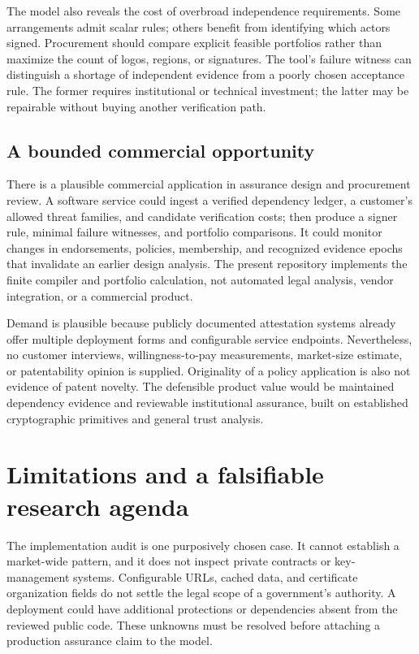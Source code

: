 \documentclass[11pt,letterpaper]{article}
\begin{document}
The model also reveals the cost of overbroad independence requirements. Some arrangements admit scalar rules; others benefit from identifying which actors signed. Procurement should compare explicit feasible portfolios rather than maximize the count of logos, regions, or signatures. The tool's failure witness can distinguish a shortage of independent evidence from a poorly chosen acceptance rule. The former requires institutional or technical investment; the latter may be repairable without buying another verification path.

\subsection{A bounded commercial opportunity}
There is a plausible commercial application in assurance design and procurement review. A software service could ingest a verified dependency ledger, a customer's allowed threat families, and candidate verification costs; then produce a signer rule, minimal failure witnesses, and portfolio comparisons. It could monitor changes in endorsements, policies, membership, and recognized evidence epochs that invalidate an earlier design analysis. The present repository implements the finite compiler and portfolio calculation, not automated legal analysis, vendor integration, or a commercial product.

Demand is plausible because publicly documented attestation systems already offer multiple deployment forms and configurable service endpoints. Nevertheless, no customer interviews, willingness-to-pay measurements, market-size estimate, or patentability opinion is supplied. Originality of a policy application is also not evidence of patent novelty. The defensible product value would be maintained dependency evidence and reviewable institutional assurance, built on established cryptographic primitives and general trust analysis.

\section{Limitations and a falsifiable research agenda}
The implementation audit is one purposively chosen case. It cannot establish a market-wide pattern, and it does not inspect private contracts or key-management systems. Configurable URLs, cached data, and certificate organization fields do not settle the legal scope of a government's authority. A deployment could have additional protections or dependencies absent from the reviewed public code. These unknowns must be resolved before attaching a production assurance claim to the model.
\end{document}
